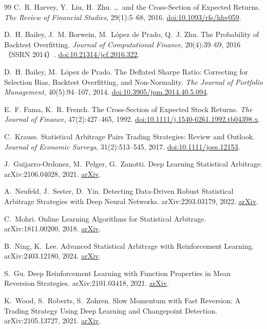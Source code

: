 \begin{thebibliography}{99}
 C.~R. Harvey, Y.~Liu, H.~Zhu. \dots\ and the Cross-Section of Expected Returns. \emph{The Review of Financial Studies}, 29(1):5--68, 2016. \href{https://doi.org/10.1093/rfs/hhv059}{doi:10.1093/rfs/hhv059}.

 D.~H. Bailey, J.~M. Borwein, M.~L\'opez de Prado, Q.~J. Zhu. The Probability of Backtest Overfitting. \emph{Journal of Computational Finance}, 20(4):39--69, 2016（SSRN 2014）. \href{https://doi.org/10.21314/jcf.2016.322}{doi:10.21314/jcf.2016.322}.

 D.~H. Bailey, M.~L\'opez de Prado. The Deflated Sharpe Ratio: Correcting for Selection Bias, Backtest Overfitting, and Non-Normality. \emph{The Journal of Portfolio Management}, 40(5):94--107, 2014. \href{https://doi.org/10.3905/jpm.2014.40.5.094}{doi:10.3905/jpm.2014.40.5.094}.

 E.~F. Fama, K.~R. French. The Cross-Section of Expected Stock Returns. \emph{The Journal of Finance}, 47(2):427--465, 1992. \href{https://doi.org/10.1111/j.1540-6261.1992.tb04398.x}{doi:10.1111/j.1540-6261.1992.tb04398.x}.

 C.~Krauss. Statistical Arbitrage Pairs Trading Strategies: Review and Outlook. \emph{Journal of Economic Surveys}, 31(2):513--545, 2017. \href{https://doi.org/10.1111/joes.12153}{doi:10.1111/joes.12153}.

 J.~Guijarro-Ordonez, M.~Pelger, G.~Zanotti. Deep Learning Statistical Arbitrage. arXiv:2106.04028, 2021. \href{https://arxiv.org/abs/2106.04028}{arXiv}.

 A.~Neufeld, J.~Sester, D.~Yin. Detecting Data-Driven Robust Statistical Arbitrage Strategies with Deep Neural Networks. arXiv:2203.03179, 2022. \href{https://arxiv.org/abs/2203.03179}{arXiv}.

 C.~Mohri. Online Learning Algorithms for Statistical Arbitrage. arXiv:1811.00200, 2018. \href{https://arxiv.org/abs/1811.00200}{arXiv}.

 B.~Ning, K.~Lee. Advanced Statistical Arbitrage with Reinforcement Learning. arXiv:2403.12180, 2024. \href{https://arxiv.org/abs/2403.12180}{arXiv}.

 S.~Gu. Deep Reinforcement Learning with Function Properties in Mean Reversion Strategies. arXiv:2101.03418, 2021. \href{https://arxiv.org/abs/2101.03418}{arXiv}.

 K.~Wood, S.~Roberts, S.~Zohren. Slow Momentum with Fast Reversion: A Trading Strategy Using Deep Learning and Changepoint Detection. arXiv:2105.13727, 2021. \href{https://arxiv.org/abs/2105.13727}{arXiv}.


\end{thebibliography}
